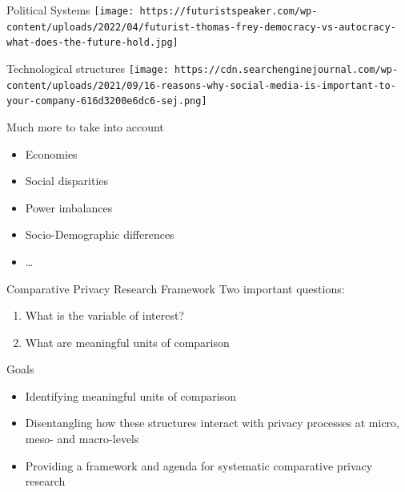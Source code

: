 \documentclass[
  ignorenonframetext,
]{beamer}
\begin{document}
\begin{frame}{Political Systems}
\protect\hypertarget{political-systems}{}
\texttt{[image: https://futuristspeaker.com/wp-content/uploads/2022/04/futurist-thomas-frey-democracy-vs-autocracy-what-does-the-future-hold.jpg]}
\end{frame}

\begin{frame}{Technological structures}
\protect\hypertarget{technological-structures}{}
\texttt{[image: https://cdn.searchenginejournal.com/wp-content/uploads/2021/09/16-reasons-why-social-media-is-important-to-your-company-616d3200e6dc6-sej.png]}
\end{frame}

\begin{frame}{Much more to take into account}
\protect\hypertarget{much-more-to-take-into-account}{}
\begin{itemize}
\item
  Economies
\item
  Social disparities
\item
  Power imbalances
\item
  Socio-Demographic differences
\item
  \ldots{}
\end{itemize}
\end{frame}

\begin{frame}{Comparative Privacy Research Framework}
\protect\hypertarget{comparative-privacy-research-framework}{}
Two important questions:

\begin{enumerate}
\item
  What is the variable of interest?
\item
  What are meaningful units of comparison
\end{enumerate}
\end{frame}

\begin{frame}{Goals}
\protect\hypertarget{goals}{}
\begin{itemize}
\item
  Identifying meaningful units of comparison
\item
  Disentangling how these structures interact with privacy processes at
  micro, meso- and macro-levels
\item
  Providing a framework and agenda for systematic comparative privacy
  research
\end{itemize}
\end{frame}
\end{document}
